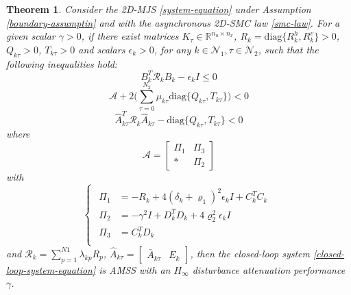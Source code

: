 \documentclass[conference]{IEEEtran}
\newtheorem{theorem}{Theorem}
\begin{document}
\begin{theorem}\label{theorem1}
	Consider the  2D-MJS \eqref{system-equation} under Assumption \eqref{boundary-assumptin} and with the asynchronous 2D-SMC law \eqref{smc-law}. For a given scalar $\gamma>0$, if there exist matrices $K_{\tau }\in\mathbb{R}^{n_u\times n_x}$,  $R_{k}=\mathrm{diag}\{R^{h}_{k},R^{v}_{k}\}>0$,  $Q_{k\tau }>0$, $T_{k\tau }>0$ and scalars $\epsilon_{k}>0$, for any $k\in\mathcal{N}_{1}, \tau\in\mathcal{N}_{2}$,  such that the following inequalities hold: 
	\begin{equation}\label{T1C1}
	B^{T}_{k}  	\mathcal{R}_{k} B_{k} -\epsilon_{k}I \leq 0
	\end{equation}
	\begin{equation}\label{T1C2}
	\mathcal{A} +2\Big(\sum_{\tau =0}^{N_{2}}\mu_{k\tau } \mathrm{diag}\{Q_{k\tau }, T_{k\tau }\}\Big) < 0
	\end{equation}
	\begin{equation}\label{T1C3}
	\hat{A}^{T}_{k\tau }\mathcal{R}_{k}\hat{A}_{k\tau } - \mathrm{diag}\{Q_{k\tau }, T_{k\tau }\} < 0
	\end{equation}
	where
	\begin{equation*}
	\mathcal{A}=\begin{bmatrix}
	\varPi_{1} & \varPi_{3}\\
	*&\varPi_{2}
	\end{bmatrix}
	\end{equation*} with
	\begin{equation*} \label{varPi}
	\left\{
	\begin{array}{lr}
	\begin{split}
	\varPi_{1}&=-R_{k}+4(\delta_{k}+\varrho_{1})^{2}\epsilon_{k}I+C^{T}_{k}C_{k}\\
	\varPi_{2}&=-\gamma^{2}I+D^{T}_{k}D_{k}+4\varrho_{2}^{2}\epsilon_{k}I\\
	\varPi_{3}&= C_{k}^{T}D_{k}\\
	\end{split}
	\end{array}
	\right.
	\end{equation*}
	and $\mathcal{R}_{k}=\sum_{p=1}^{N1}\lambda_{kp}R_{p}$, $\hat{A}_{k\tau }=\begin{bmatrix}
	\bar{A}_{k\tau }& E_{k}
	\end{bmatrix}$, 
	then the closed-loop system \eqref{closed-loop-system-equation} is AMSS with an $H_{\infty}$ disturbance attenuation performance $\gamma$.
\end{theorem}
\end{document}
